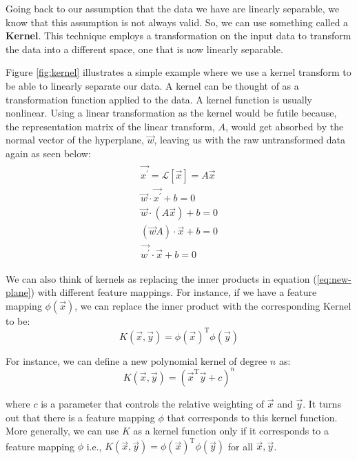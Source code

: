 Going back to our assumption that the data we have are linearly separable, we know that this assumption is not always valid. So, we can use something called a \textbf{Kernel}. This technique employs a transformation on the input data to transform the data into a different space, one that is now linearly separable.

Figure \ref{fig:kernel} illustrates a simple example where we use a kernel transform to be able to linearly separate our data. A kernel can be thought of as a transformation function applied to the data. A kernel function is usually nonlinear. Using a linear transformation as the kernel would be futile because, the representation matrix of the linear transform, $A$, would get absorbed by the normal vector of the hyperplane, $\vec{w}$, leaving us with the raw untransformed data again as seen below:
\begin{gather}
\begin{aligned}
	\vec{x^{'}} = \mathcal{L}[\vec{x}] = A\vec{x} \nonumber\\
	\vec{w}\cdot\vec{x^{'}} + b = 0 \nonumber\\
	\vec{w}\cdot (A\vec{x}) + b = 0 \nonumber\\
	(\vec{w}A)\cdot\vec{x} + b = 0 \nonumber\\
	\vec{w^{'}}\cdot\vec{x} + b = 0
\end{aligned}
\end{gather}

We can also think of kernels as replacing the inner products in equation (\ref{eq:new-plane}) with different feature mappings. For instance, if we have a feature mapping $\phi(\vec{x})$, we can replace the inner product with the corresponding Kernel to be:
\begin{equation*}
K(\vec{x}, \vec{y}) = \phi(\vec{x})^{\text{T}}\phi(\vec{y})
\end{equation*}

For instance, we can define a new polynomial kernel of degree $n$ as:
\begin{equation*}
K(\vec{x}, \vec{y}) = (\vec{x}^{\text{T}}\vec{y} + c)^n
\end{equation*}

where $c$ is a parameter that controls the relative weighting of $\vec{x}$ and $\vec{y}$. It turns out that there is a feature mapping $\phi$ that corresponds to this kernel function. More generally, we can use $K$ as a kernel function only if it corresponds to a feature mapping $\phi$ i.e., $K(\vec{x}, \vec{y}) = \phi(\vec{x})^{\text{T}}\phi(\vec{y})$ for all $\vec{x}, \vec{y}$.

